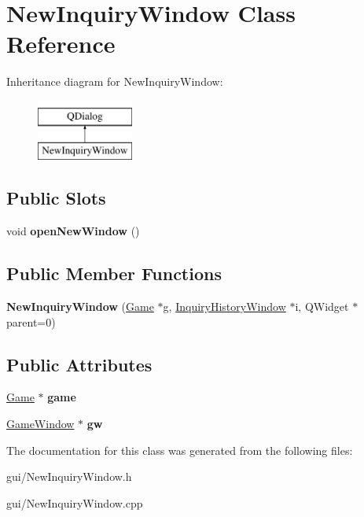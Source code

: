 \hypertarget{classNewInquiryWindow}{}\section{New\+Inquiry\+Window Class Reference}
\label{classNewInquiryWindow}
Inheritance diagram for New\+Inquiry\+Window\+:\begin{figure}[H]
\begin{center}
\leavevmode
\includegraphics[height=2.000000cm]{classNewInquiryWindow}
\end{center}
\end{figure}
\subsection*{Public Slots}
\begin{DoxyCompactItemize}
\item 
\mbox{\label{classNewInquiryWindow_aa8d01ffe4f4dc704505785f507652bd2}} 
void {\bfseries open\+New\+Window} ()
\end{DoxyCompactItemize}
\subsection*{Public Member Functions}
\begin{DoxyCompactItemize}
\item 
\mbox{\label{classNewInquiryWindow_a1fb15d4ea79c5b3c8c81b2e523eeffa8}} 
{\bfseries New\+Inquiry\+Window} (\hyperlink{classGame}{Game} $\ast$g, \hyperlink{classInquiryHistoryWindow}{Inquiry\+History\+Window} $\ast$i, Q\+Widget $\ast$parent=0)
\end{DoxyCompactItemize}
\subsection*{Public Attributes}
\begin{DoxyCompactItemize}
\item 
\mbox{\label{classNewInquiryWindow_a76c564bfdd2a2950d4190e0d7b55091e}} 
\hyperlink{classGame}{Game} $\ast$ {\bfseries game}
\item 
\mbox{\label{classNewInquiryWindow_a78a6436a76286c46819f4c3c4b42b2be}} 
\hyperlink{classGameWindow}{Game\+Window} $\ast$ {\bfseries gw}
\end{DoxyCompactItemize}


The documentation for this class was generated from the following files\+:\begin{DoxyCompactItemize}
\item 
gui/New\+Inquiry\+Window.\+h\item 
gui/New\+Inquiry\+Window.\+cpp\end{DoxyCompactItemize}
